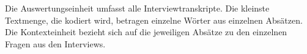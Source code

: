 Die Auswertungseinheit umfasst alle Interviewtranskripte. Die kleinste Textmenge, die kodiert wird, betragen einzelne Wörter aus einzelnen Absätzen. Die Kontexteinheit bezieht sich auf die jeweiligen Absätze zu den einzelnen Fragen aus den Interviews.
%	
%	
